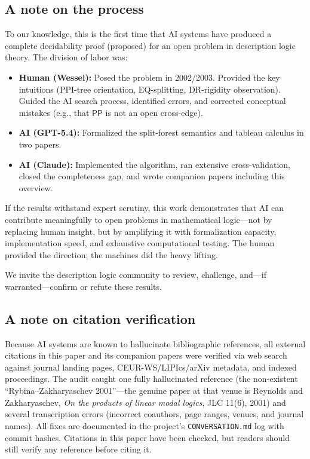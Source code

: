 \documentclass[
]{ceurart}
\theoremstyle{definition}
\newcommand{\PP}{\ensuremath{\mathsf{PP}}}
\begin{document}
\subsection{A note on the process}

To our knowledge, this is the first time that AI systems have
produced a complete decidability proof (proposed) for an open
problem in description logic theory.  The division of labor was:
\begin{itemize}
  \item \textbf{Human (Wessel):} Posed the problem in 2002/2003.
    Provided the key intuitions (PPI-tree orientation, EQ-splitting,
    DR-rigidity observation).  Guided the AI search process,
    identified errors, and corrected conceptual mistakes
    (e.g., that $\PP$ is not an open cross-edge).
  \item \textbf{AI (GPT-5.4):} Formalized the split-forest semantics
    and tableau calculus in two papers.
  \item \textbf{AI (Claude):} Implemented the algorithm, ran
    extensive cross-validation, closed the completeness gap, and
    wrote companion papers including this overview.
\end{itemize}

If the results withstand expert scrutiny, this work demonstrates
that AI can contribute meaningfully to open problems in
mathematical logic---not by replacing human insight, but by
amplifying it with formalization capacity, implementation speed,
and exhaustive computational testing.  The human provided
the direction; the machines did the heavy lifting.

We invite the description logic community to review, challenge,
and---if warranted---confirm or refute these results.

\subsection{A note on citation verification}

Because AI systems are known to hallucinate bibliographic references,
all external citations in this paper and its companion papers were
verified via web search against journal landing pages,
CEUR-WS/LIPIcs/arXiv metadata, and indexed proceedings.  The audit
caught one fully hallucinated reference (the non-existent
``Rybina--Zakharyaschev 2001''---the genuine paper at that venue is
Reynolds and Zakharyaschev, \emph{On the products of linear modal
logics}, JLC 11(6), 2001) and several transcription errors
(incorrect coauthors, page ranges, venues, and journal names).  All
fixes are documented in the project's \texttt{CONVERSATION.md} log
with commit hashes.  Citations in this paper have been checked, but
readers should still verify any reference before citing it.
\end{document}
